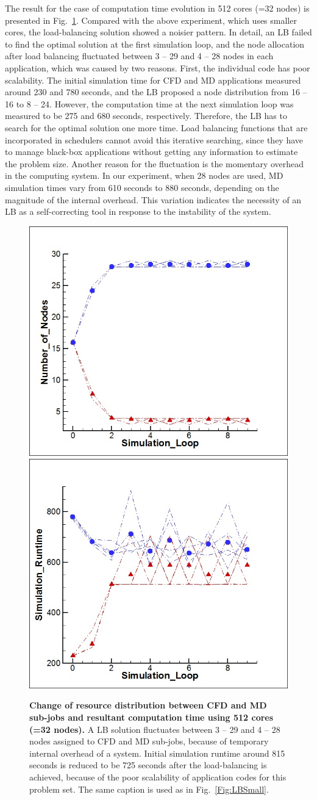 \documentclass[preprint,12pt]{elsarticle}
\begin{document}
The result for the case of computation time evolution in 512 cores (=32 nodes) is presented in Fig.~\ref{Fig:LBLarge}. Compared with the above experiment, which uses smaller cores, the load-balancing solution showed a noisier pattern. In detail, an LB failed to find the optimal solution at the first simulation loop, and the node allocation after load balancing fluctuated between 3 -- 29 and 4 -- 28 nodes in each application, which was caused by two reasons. First, the individual code has poor scalability. The initial simulation time for CFD and MD applications measured around 230 and 780 seconds, and the LB proposed a node distribution from 16 -- 16 to 8 -- 24. However, the computation time at the next simulation loop was measured to be 275 and 680 seconds, respectively. Therefore, the LB has to search for the optimal solution one more time. Load balancing functions that are incorporated in schedulers cannot avoid this iterative searching, since they have to manage black-box applications without getting any information to estimate the problem size. Another reason for the fluctuation is the momentary overhead in the computing system. In our experiment, when 28 nodes are used, MD simulation times vary from 610 seconds to 880 seconds, depending on the magnitude of the internal overhead. This variation indicates the necessity of an LB as a self-correcting tool in response to the instability of the system.

\begin{figure}
\centering
\includegraphics[width=0.3\linewidth]{512_Node.jpg}
\includegraphics[width=0.3\linewidth]{512_Time.jpg}
\caption{\small {\bf Change of resource distribution between 
CFD and MD sub-jobs and resultant computation time using 512 cores (=32 nodes).}
A LB solution fluctuates between 3 -- 29 and 4 -- 28 nodes assigned to
CFD and MD sub-jobs, because of temporary internal overhead of a system.
Initial simulation runtime around 815 seconds is reduced to be 725 seconds
after the load-balancing is achieved, because of the poor scalability of 
application codes for this problem set. 
The same caption is used as in Fig.~\ref{Fig:LBSmall}.
}
\label{Fig:LBLarge}
\vspace{-1em}
\end{figure}
\end{document}
